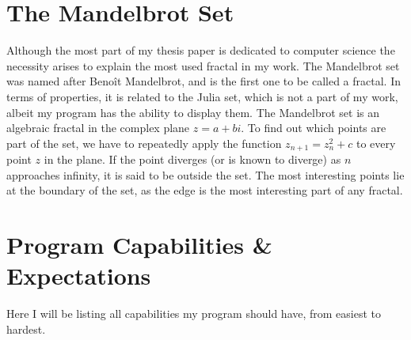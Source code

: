 \documentclass[10pt,a4paper,titlepage]{article}
\begin{document}
	
	\section{The Mandelbrot Set}
	Although the most part of my thesis paper is dedicated to computer science the necessity arises to explain the most used fractal in my work. The Mandelbrot set was named after Benoît Mandelbrot, and is the first one to be called a fractal. In terms of properties, it is related to the Julia set, which is not a part of my work, albeit my program has the ability to display them. The Mandelbrot set is an algebraic fractal in the complex plane \(z = a + b i\). To find out which points are part of the set, we have to repeatedly apply the function \(z_{n+1} = z_{n}^2 + c\) to every point \(z\) in the plane. If the point diverges (or is known to diverge) as \(n\) approaches infinity, it is said to be outside the set. The most interesting points lie at the boundary of the set, as the edge is the most interesting part of any fractal.
	
	
	\section{Program Capabilities \& Expectations}
	Here I will be listing all capabilities my program should have, from easiest to hardest.
\end{document}
